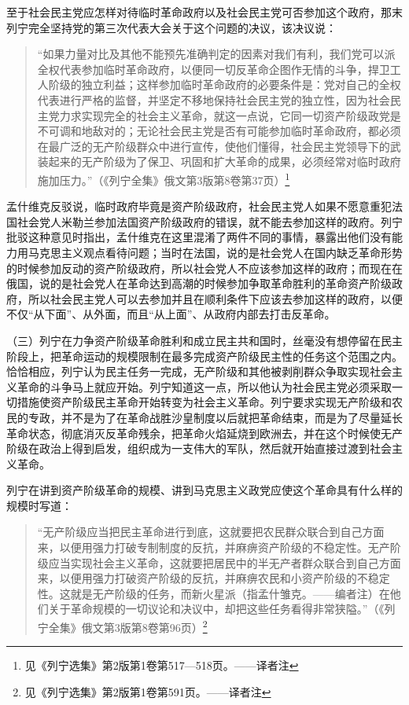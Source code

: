 至于社会民主党应怎样对待临时革命政府以及社会民主党可否参加这个政府，那末列宁完全坚持党的第三次代表大会关于这个问题的决议，该决议说：

\begin{quotation}
“如果力量对比及其他不能预先准确判定的因素对我们有利，我们党可以派全权代表参加临时革命政府，以便同一切反革命企图作无情的斗争，捍卫工人阶级的独立利益；这样参加临时革命政府的必要条件是：党对自己的全权代表进行严格的监督，并坚定不移地保持社会民主党的独立性，因为社会民主党力求实现完全的社会主义革命，就这一点说，它同一切资产阶级政党是不可调和地敌对的；无论社会民主党是否有可能参加临时革命政府，都必须在最广泛的无产阶级群众中进行宣传，使他们懂得，社会民主党领导下的武装起来的无产阶级为了保卫、巩固和扩大革命的成果，必须经常对临时政府施加压力。”（《列宁全集》俄文第3版第8卷第37页）\footnote{见《列宁选集》第2版第1卷第517—518页。——译者注}
\end{quotation}

孟什维克反驳说，临时政府毕竟是资产阶级政府，社会民主党人如果不愿意重犯法国社会党人米勒兰参加法国资产阶级政府的错误，就不能去参加这样的政府。列宁批驳这种意见时指出，孟什维克在这里混淆了两件不同的事情，暴露出他们没有能力用马克思主义观点看待问题；当时在法国，说的是社会党人在国内缺乏革命形势的时候参加反动的资产阶级政府，所以社会党人不应该参加这样的政府；而现在在俄国，说的是社会党人在革命达到高潮的时候参加争取革命胜利的革命资产阶级政府，所以社会民主党人可以去参加并且在顺利条件下应该去参加这样的政府，以便不仅“从下面”、从外面，而且“从上面”、从政府内部去打击反革命。

（三）列宁在力争资产阶级革命胜利和成立民主共和国时，丝毫没有想停留在民主阶段上，把革命运动的规模限制在最多完成资产阶级民主性的任务这个范围之内。恰恰相应，列宁认为民主任务一完成，无产阶级和其他被剥削群众争取实现社会主义革命的斗争马上就应开始。列宁知道这一点，所以他认为社会民主党必须采取一切措施使资产阶级民主革命开始转变为社会主义革命。列宁要求实现无产阶级和农民的专政，并不是为了在革命战胜沙皇制度以后就把革命结束，而是为了尽量延长革命状态，彻底消灭反革命残余，把革命火焰延烧到欧洲去，并在这个时候使无产阶级在政治上得到启发，组织成为一支伟大的军队，然后就开始直接过渡到社会主义革命。

列宁在讲到资产阶级革命的规模、讲到马克思主义政党应使这个革命具有什么样的规模时写道：

\begin{quotation}
“无产阶级应当把民主革命进行到底，这就要把农民群众联合到自己方面来，以便用强力打破专制制度的反抗，并麻痹资产阶级的不稳定性。无产阶级应当实现社会主义革命，这就要把居民中的半无产者群众联合到自己方面来，以便用强力打破资产阶级的反抗，并麻痹农民和小资产阶级的不稳定性。这就是无产阶级的任务，而新火星派（指孟什雏克。——编者注）在他们关于革命规模的一切议论和决议中，却把这些任务看得非常狭隘。”（《列宁全集》俄文第3版第8卷第96页）\footnote{见《列宁选集》第2版第1卷第591页。——译者注}
\end{quotation}

